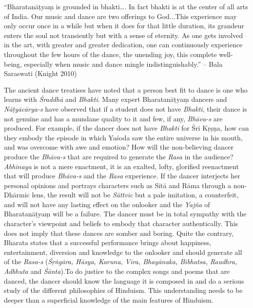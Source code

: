 \begin{myquote}
“Bharatanāṭyaṃ is grounded in bhakti…. In fact bhakti is at the center of all arts of India. Our music and dance are two offerings to God...This experience may only occur once in a while but when it does for that little duration, its grandeur enters the soul not transiently but with a sense of eternity. As one gets involved in the art, with greater and greater dedication, one can continuously experience throughout the few hours of the dance, the unending joy, this complete well-being, especially when music and dance mingle indistinguishably.” – Bala Saraswati (Knight 2010)
\end{myquote}

The ancient dance treatises have noted that a person best fit to dance is one who learns with \textit{Śraddhā} and \textit{Bhakti}. Many expert Bharatanāṭyaṃ dancers and \textit{Nāṭyācārya-s }have observed that if a student does not have \textit{Bhakti}, their dance is not genuine and has a mundane quality to it and few, if any, \textit{Bhāva-s} are produced. For example, if the dancer does not have \textit{Bhakti} for Śri Kṛṣṇa, how can they embody the episode in which Yaśoda saw the entire universe in his mouth, and was overcome with awe and emotion? How will the non-believing dancer produce the \textit{Bhāva-s} that are required to generate the \textit{Rasa} in the audience? \textit{Abhinaya} is not a mere enactment, it is an exalted, lofty, glorified reenactment that will produce \textit{Bhāva-s} and the \textit{Rasa} experience. If the dancer interjects her personal opinions and portrays characters such as Sītā and Rāma through a non-Dhārmic lens, the result will not be \textit{Sāttvic} but a pale imitation, a counterfeit, and will not have any lasting effect on the onlooker and the \textit{Yajña} of Bharatanāṭyaṃ will be a failure. The dancer must be in total sympathy with the character’s viewpoint and beliefs to embody that character authentically. This does not imply that these dances are somber and boring. Quite the contrary, Bharata states that a successful performance brings about happiness, entertainment, diversion and knowledge to the onlooker and should generate all of the \textit{Rasa-s} (\textit{Śṛṅgāra, Hāsya, Karuna, Vīra, Bhayānaka, Bībhatsa, Raudhra, Adbhuta} and \textit{Śānta}).To do justice to the complex songs and poems that are danced, the dancer should know the language it is composed in and do a serious study of the different philosophies of Hinduism. This understanding needs to be deeper than a superficial knowledge of the main features of Hinduism.


